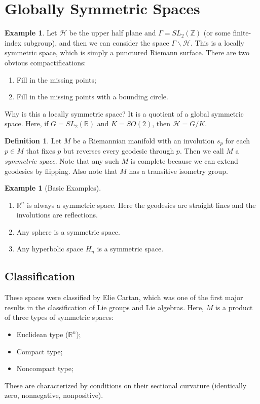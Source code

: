 \documentclass[leqno, openany]{memoir}
\theoremstyle{definition}
\newtheorem{defn}[thm]{Definition}
\newtheorem{exm}[thm]{Example}
\theoremstyle{remark}
\theoremstyle{plain}
\theoremstyle{definition}
\theoremstyle{remark}
\newcommand{\R}{\mathbb{R}}
\newcommand{\Z}{\mathbb{Z}}
\newcommand{\mc}[1]{\mathcal{#1}}
\begin{document}
\section{Globally Symmetric Spaces}%
\label{sec:Globally_symmetric_spaces}

\begin{exm}
    Let $\mc{H}$ be the upper half plane and $\Gamma = SL_2(\Z)$ (or some finite-index subgroup), and then we can consider the space $\Gamma \backslash \mc{H}$. This is a locally symmetric space, which is simply a punctured Riemann surface. There are two obvious compactifications:
    \begin{enumerate}
        \item Fill in the missing points;
        \item Fill in the missing points with a bounding circle.
    \end{enumerate}
    Why is this a locally symmetric space? It is a quotient of a global symmetric space. Here, if $G = SL_2(\R)$ and $K = SO(2)$, then $\mc{H} = G/K$.
\end{exm}

\begin{defn}
    Let $M$ be a Riemannian manifold with an involution $s_p$ for each $p \in M$ that fixes $p$ but reverses every geodesic through $p$. Then we call $M$ a \textit{symmetric space}. Note that any such $M$ is complete because we can extend geodesics by flipping. Also note that $M$ has a transitive isometry group.
\end{defn}

\begin{exm}[Basic Examples]
    \begin{enumerate}
        \item $\R^n$ is always a symmetric space. Here the geodesics are straight lines and the involutions are reflections.
        \item Any sphere is a symmetric space.
        \item Any hyperbolic space $H_n$ is a symmetric space.
    \end{enumerate}
\end{exm}

\subsection{Classification}%
\label{sub:classification}

These spaces were classified by Elie Cartan, which was one of the first major results in the classification of Lie groups and Lie algebras. Here, $M$ is a product of three types of symmetric spaces:
\begin{itemize}
    \item Euclidean type ($\R^n$);
    \item Compact type;
    \item Noncompact type;
\end{itemize}
These are characterized by conditions on their sectional curvature (identically zero, nonnegative, nonpositive).
\end{document}
